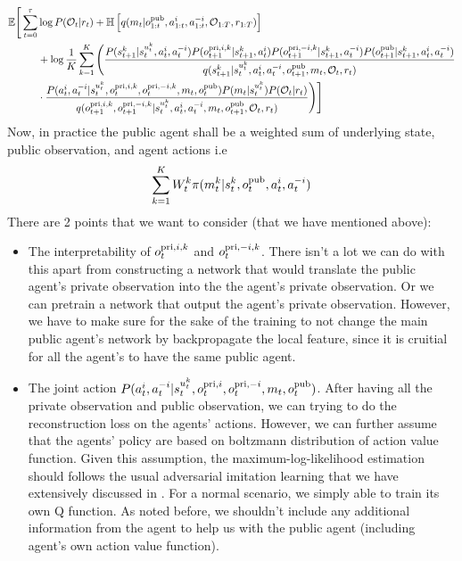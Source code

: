 \begin{equation}
\begin{aligned}
\label{eqn:chap5-elbo-public-agent}
    \mathbb{E}\Bigg[\sum^\tau_{t=0} &\log P(\mathcal{O}_t | r_t) + \mathbb{H}\left[ q(m_t | o^{\operatorname{pub}}_{1:t}, a^{i}_{1:t}, a^{-i}_{1:t}, \mathcal{O}_{1:T}, r_{1:T}) \right] \\
    &+ \log \frac{1}{K} \sum ^K_{k=1}\Bigg(\frac{P(s_{t+1}^k | s_t^{u^k_t}, a_t^i, a_t^{-i})P(o^{\operatorname{pri}, i, k}_{t+1} | s_{t+1}^k, a^i_t) P(o^{\operatorname{pri}, -i, k}_{t+1} | s_{t+1}^k, a^{-i}_t) P(o^{\operatorname{pub}}_{t+1} | s_{t+1}^k, a^i_t, a^{-i}_t)}{q(s_{t+1}^k | s_t^{u^k_t}, a^i_t, a^{-i}_t, o^{\operatorname{pub}}_{t+1}, m_t, \mathcal{O}_t, r_t)} \\
    &\cdot \frac{P(a^i_t, a^{-i}_t | s_t^{u^k_t}, o^{\operatorname{pri}, i, k}_t, o^{\operatorname{pri}, -i, k}_t, m_t, o^{\operatorname{pub}}_t) P(m_t | s_t^{u^k_t}) P(\mathcal{O}_t | r_t)}{q(o^{\operatorname{pri}, i, k}_{t+1}, o^{\operatorname{pri}, -i, k}_{t+1} | s_t^{u^k_t}, a^i_t, a^{-i}_t, m_t, o^{\operatorname{pub}}_{t+1}, \mathcal{O}_t, r_t)} \Bigg)\Bigg]
\end{aligned}
\end{equation}
Now, in practice the public agent shall be a weighted sum of underlying state, public observation, and agent actions i.e
\begin{equation}
    \sum^K_{k=1} W^k_t \pi(m^k_t | s^k_t, o^{\operatorname{pub}}_t, a^i_t, a^{-i}_t)
\end{equation}
There are 2 points that we want to consider (that we have mentioned above):
\begin{itemize}
    \item The interpretability of $o^{\operatorname{pri}, i, k}_t$ and $o^{\operatorname{pri}, -i, k}_t$. There isn't a lot we can do with this apart from constructing a network that would translate the public agent's private observation into the the agent's private observation. Or we can pretrain a network that output the agent's private observation. However, we have to make sure for the sake of the training to not change the main public agent's network by backpropagate the local feature, since it is cruitial for all the agent's to have the same public agent.
    \item The joint action $P(a^i_t, a^{-i}_t | s_t^{u^k_t}, o^{\operatorname{pri}, i}_t, o^{\operatorname{pri}, -i}_t, m_t, o^{\operatorname{pub}}_t)$. After having all the private observation and public observation, we can trying to do the reconstruction loss on the agents' actions. However, we can further assume that the agents' policy are based on boltzmann distribution of action value function. Given this assumption, the maximum-log-likelihood estimation should follows the usual adversarial imitation learning that we have extensively discussed in \cite{yu2019multi}. For a normal scenario, we simply able to train its own Q function. As noted before, we shouldn't include any additional information from the agent to help us with the public agent (including agent's own action value function). 
\end{itemize}
